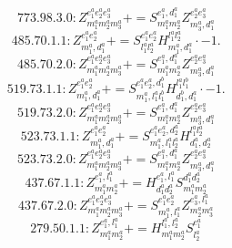 \documentclass[letterpaper,10pt,fleqn,leqno,onecolumn]{article}
\begin{document}
\begin{equation} \;\;\;\;\;\;  773.98.3.0: Z^{e_{1}^{a}e_{2}^{a}e_{3}^{a}}_{m_{1}^{a}m_{2}^{a}m_{3}^{a}}+=S^{e_{1}^{a},d_{1}^{a}}_{m_{1}^{a}m_{2}^{a}}Z^{e_{2}^{a}e_{3}^{a}}_{m_{3}^{a},d_{1}^{a}} \end{equation}
\begin{equation} \;\;\;\;\;\;  485.70.1.1: Z^{e_{1}^{a}e_{2}^{a}}_{m_{1}^{a},d_{1}^{a}}+=S^{e_{1}^{a}e_{2}^{a}}_{l_{1}^{a}l_{2}^{a}}H^{l_{1}^{a}l_{2}^{a}}_{m_{1}^{a},d_{1}^{a}}\cdot -1. \end{equation}
\begin{equation} \;\;\;\;\;\;  485.70.2.0: Z^{e_{1}^{a}e_{2}^{a}e_{3}^{a}}_{m_{1}^{a}m_{2}^{a}m_{3}^{a}}+=S^{e_{1}^{a},d_{1}^{a}}_{m_{1}^{a}m_{2}^{a}}Z^{e_{2}^{a}e_{3}^{a}}_{m_{3}^{a},d_{1}^{a}} \end{equation}
\begin{equation} \;\;\;\;\;\;  519.73.1.1: Z^{e_{1}^{a}e_{2}^{a}}_{m_{1}^{a},d_{1}^{a}}+=S^{e_{1}^{a}e_{2}^{a},d_{1}^{b}}_{m_{1}^{a},l_{1}^{a}l_{1}^{b}}H^{l_{1}^{a}l_{1}^{b}}_{d_{1}^{b},d_{1}^{a}}\cdot -1. \end{equation}
\begin{equation} \;\;\;\;\;\;  519.73.2.0: Z^{e_{1}^{a}e_{2}^{a}e_{3}^{a}}_{m_{1}^{a}m_{2}^{a}m_{3}^{a}}+=S^{e_{1}^{a},d_{1}^{a}}_{m_{1}^{a}m_{2}^{a}}Z^{e_{2}^{a}e_{3}^{a}}_{m_{3}^{a},d_{1}^{a}} \end{equation}
\begin{equation} \;\;\;\;\;\;  523.73.1.1: Z^{e_{1}^{a}e_{2}^{a}}_{m_{1}^{a},d_{1}^{a}}+=S^{e_{1}^{a}e_{2}^{a},d_{2}^{a}}_{m_{1}^{a},l_{1}^{a}l_{2}^{a}}H^{l_{1}^{a}l_{2}^{a}}_{d_{1}^{a},d_{2}^{a}} \end{equation}
\begin{equation} \;\;\;\;\;\;  523.73.2.0: Z^{e_{1}^{a}e_{2}^{a}e_{3}^{a}}_{m_{1}^{a}m_{2}^{a}m_{3}^{a}}+=S^{e_{1}^{a},d_{1}^{a}}_{m_{1}^{a}m_{2}^{a}}Z^{e_{2}^{a}e_{3}^{a}}_{m_{3}^{a},d_{1}^{a}} \end{equation}
\begin{equation} \;\;\;\;\;\;  437.67.1.1: Z^{e_{1}^{a},l_{1}^{a}}_{m_{1}^{a}m_{2}^{a}}+=H^{e_{1}^{a},l_{1}^{a}}_{d_{1}^{a}d_{2}^{a}}S^{d_{1}^{a}d_{2}^{a}}_{m_{1}^{a}m_{2}^{a}} \end{equation}
\begin{equation} \;\;\;\;\;\;  437.67.2.0: Z^{e_{1}^{a}e_{2}^{a}e_{3}^{a}}_{m_{1}^{a}m_{2}^{a}m_{3}^{a}}+=S^{e_{1}^{a}e_{2}^{a}}_{m_{1}^{a},l_{1}^{a}}Z^{e_{3}^{a},l_{1}^{a}}_{m_{2}^{a}m_{3}^{a}} \end{equation}
\begin{equation} \;\;\;\;\;\;  279.50.1.1: Z^{e_{1}^{a},l_{1}^{a}}_{m_{1}^{a}m_{2}^{a}}+=H^{l_{1}^{a},l_{2}^{a}}_{m_{1}^{a}m_{2}^{a}}S^{e_{1}^{a}}_{l_{2}^{a}} \end{equation}
\end{document}
